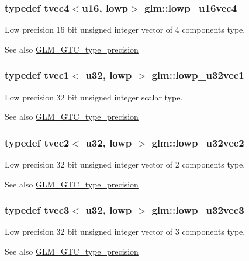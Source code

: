 \subsubsection[{lowp\+\_\+u16vec4}]{\setlength{\rightskip}{0pt plus 5cm}typedef tvec4$<${\bf u16}, lowp$>$ {\bf glm\+::lowp\+\_\+u16vec4}}\label{namespaceglm_a503d858a175ae9b4c92008ec12bfb3eb}
Low precision 16 bit unsigned integer vector of 4 components type. \begin{DoxySeeAlso}{See also}
\hyperlink{group__gtc__type__precision}{G\+L\+M\+\_\+\+G\+T\+C\+\_\+type\+\_\+precision} 
\end{DoxySeeAlso}
\hypertarget{namespaceglm_a285d2823d7fe4f3969f838b31bcd4d32}{}
\subsubsection[{lowp\+\_\+u32vec1}]{\setlength{\rightskip}{0pt plus 5cm}typedef tvec1$<$ {\bf u32}, lowp $>$ {\bf glm\+::lowp\+\_\+u32vec1}}\label{namespaceglm_a285d2823d7fe4f3969f838b31bcd4d32}
Low precision 32 bit unsigned integer scalar type. \begin{DoxySeeAlso}{See also}
\hyperlink{group__gtc__type__precision}{G\+L\+M\+\_\+\+G\+T\+C\+\_\+type\+\_\+precision} 
\end{DoxySeeAlso}
\hypertarget{namespaceglm_a85eccbd086ad8390173a7c243bb0e90b}{}
\subsubsection[{lowp\+\_\+u32vec2}]{\setlength{\rightskip}{0pt plus 5cm}typedef tvec2$<$ {\bf u32}, lowp $>$ {\bf glm\+::lowp\+\_\+u32vec2}}\label{namespaceglm_a85eccbd086ad8390173a7c243bb0e90b}
Low precision 32 bit unsigned integer vector of 2 components type. \begin{DoxySeeAlso}{See also}
\hyperlink{group__gtc__type__precision}{G\+L\+M\+\_\+\+G\+T\+C\+\_\+type\+\_\+precision} 
\end{DoxySeeAlso}
\hypertarget{namespaceglm_a2639b769b47b8fd609913bf38d3103c4}{}
\subsubsection[{lowp\+\_\+u32vec3}]{\setlength{\rightskip}{0pt plus 5cm}typedef tvec3$<$ {\bf u32}, lowp $>$ {\bf glm\+::lowp\+\_\+u32vec3}}\label{namespaceglm_a2639b769b47b8fd609913bf38d3103c4}
Low precision 32 bit unsigned integer vector of 3 components type. \begin{DoxySeeAlso}{See also}
\hyperlink{group__gtc__type__precision}{G\+L\+M\+\_\+\+G\+T\+C\+\_\+type\+\_\+precision} 
\end{DoxySeeAlso}
\hypertarget{namespaceglm_ab671efbf3b747eb8422971b60c925300}{}
